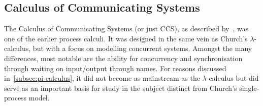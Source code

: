 \subsection{Calculus of Communicating Systems}

    The Calculus of Communicating Systems (or just CCS), as described by~\cite{ccs-syntax}, was one of the earlier\footnotemark{} process calculi.
    It was designed in the same vein as Church's $\lambda$-calculus, but with a focus on modelling concurrent systems.
    Amongst the many differences, most notable are the ability for concurrency and synchronisation through waiting on input/output through names.
    For reasons discussed in~\ref{subsec:pi-calculus}, it did not become as mainstream as the $\lambda$-calculus but did serve as an important basis for study in the subject distinct from Church's single-process model.



